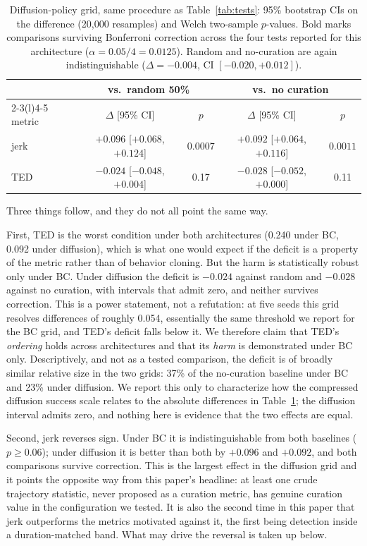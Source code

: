 \documentclass{article}
\begin{document}
\begin{table}[t]
\centering
\small
\begin{tabular}{lcccc}
\toprule
& \multicolumn{2}{c}{vs.\ random 50\%} & \multicolumn{2}{c}{vs.\ no curation} \\
\cmidrule(lr){2-3}\cmidrule(l){4-5}
metric & $\Delta$ [95\% CI] & $p$ & $\Delta$ [95\% CI] & $p$ \\
\midrule
jerk & $+0.096$ [$+0.068$, $+0.124$] & $\mathbf{0.0007}$ & $+0.092$ [$+0.064$, $+0.116$] & $\mathbf{0.0011}$ \\
TED  & $-0.024$ [$-0.048$, $+0.004$] & 0.17 & $-0.028$ [$-0.052$, $+0.000$] & 0.11 \\
\bottomrule
\end{tabular}
\caption{Diffusion-policy grid, same procedure as Table~\ref{tab:tests}:
95\% bootstrap CIs on the difference (20{,}000 resamples) and Welch
two-sample $p$-values. Bold marks comparisons surviving Bonferroni
correction across the four tests reported for this architecture
($\alpha = 0.05/4 = 0.0125$). Random and no-curation are again
indistinguishable ($\Delta = -0.004$, CI $[-0.020, +0.012]$).}
\label{tab:crossarch_tests}
\end{table}

Three things follow, and they do not all point the same way.

First, TED is the worst condition under both architectures (0.240 under BC,
0.092 under diffusion), which is what one would expect if the deficit is a
property of the metric rather than of behavior cloning. But the harm is
statistically robust only under BC. Under diffusion the deficit is $-0.024$
against random and $-0.028$ against no curation, with intervals that admit
zero, and neither survives correction. This is a power statement, not a
refutation: at five seeds this grid resolves differences of roughly 0.054,
essentially the same threshold we report for the BC grid, and TED's deficit
falls below it. We therefore claim that TED's \emph{ordering} holds across
architectures and that its \emph{harm} is demonstrated under BC only.
Descriptively, and not as a tested comparison, the deficit is of broadly
similar relative size in the two grids: 37\% of the no-curation baseline
under BC and 23\% under diffusion. We report this only to characterize how
the compressed diffusion success scale relates to the absolute differences
in Table~\ref{tab:crossarch_tests}; the diffusion interval admits zero, and
nothing here is evidence that the two effects are equal.

Second, jerk reverses sign. Under BC it is indistinguishable from both
baselines ($p \geq 0.06$); under diffusion it is better than both by $+0.096$
and $+0.092$, and both comparisons survive correction. This is the largest
effect in the diffusion grid and it points the opposite way from this
paper's headline: at least one crude trajectory statistic, never proposed as
a curation metric, has genuine curation value in the configuration we
tested. It is also the second time in this paper that jerk outperforms the
metrics motivated against it, the first being detection inside a
duration-matched band. What may drive the reversal is taken up below.
\end{document}
